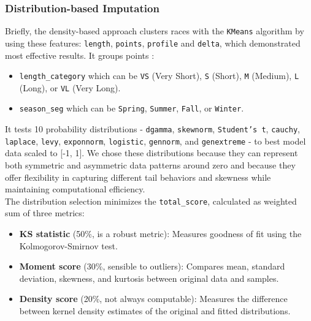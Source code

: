 \documentclass[a4paper, twoside]{article}
\begin{document}
\subsubsection{Distribution-based Imputation}
Briefly, the density-based approach clusters races with the \texttt{KMeans} algorithm by using these features: \texttt{length}, \texttt{points}, \texttt{profile} and \texttt{delta}, which demonstrated most effective results. It groups points   : 
\begin{itemize}[noitemsep]
    \item \texttt{length\_category} which can be \texttt{VS} (Very Short), \texttt{S} (Short), \texttt{M} (Medium), \texttt{L} (Long), or \texttt{VL} (Very Long).
    \item \texttt{season\_seg} which can be \texttt{Spring}, \texttt{Summer}, \texttt{Fall}, or \texttt{Winter}.
\end{itemize}
It tests 10 probability distributions - \texttt{dgamma}, \texttt{skewnorm}, \texttt{Student's t}, \texttt{cauchy}, \texttt{laplace}, \texttt{levy}, \texttt{exponnorm}, \texttt{logistic}, \texttt{gennorm}, and \texttt{genextreme} - to best model data scaled to [-1, 1]. We chose these distributions because they can represent both symmetric and asymmetric data patterns around zero and because they offer flexibility in capturing different tail behaviors and skewness while maintaining computational efficiency. 
\\
The distribution selection minimizes the \texttt{total\_score}, calculated as weighted sum of three metrics:
\begin{itemize}[noitemsep]
    \item \textbf{KS statistic} (50\%, is a robust metric): Measures goodness of fit using the Kolmogorov-Smirnov test.
    \item \textbf{Moment score} (30\%, sensible to outliers): Compares mean, standard deviation, skewness, and kurtosis between original data and samples.
    \item \textbf{Density score} (20\%, not always computable): Measures the difference between kernel density estimates of the original and fitted distributions.
\end{itemize}
\end{document}
